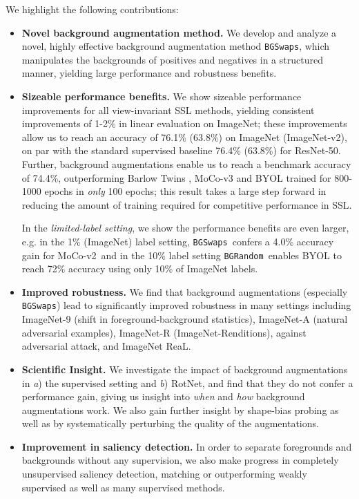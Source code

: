 \documentclass[twoside,11pt]{article}
\newcommand{\bgswaps}{\texttt{BG\textunderscore Swaps}}
\newcommand{\bgrand}{\texttt{BG\textunderscore Random}}
\newcommand{\moco}{MoCo-v2}
\begin{document}
We highlight the following contributions:
\begin{itemize}[leftmargin=2em]
    
    \item \textbf{Novel background augmentation method.} We develop and analyze a novel, highly effective background augmentation method \bgswaps, which manipulates the backgrounds of positives and negatives in a structured manner, yielding large performance and robustness benefits.

    \item \textbf{Sizeable performance benefits.} We show sizeable performance improvements for all view-invariant SSL methods, yielding consistent improvements of 1-2\% in linear evaluation on ImageNet; these improvements allow us to reach an accuracy of 76.1\% (63.8\%) on ImageNet (ImageNet-v2), on par with the standard supervised baseline 76.4\% (63.8\%) for ResNet-50. Further, background augmentations enable us to reach a benchmark accuracy of 74.4\%, outperforming Barlow Twins \citep{zbontar_barlow_2021}, MoCo-v3 \citep{chen_empirical_2021} and BYOL trained for 800-1000 epochs in \textit{only} 100 epochs; this result takes a large step forward in reducing the amount of training required for competitive performance in SSL.
    
    In the \textit{limited-label setting}, we show the performance benefits are even larger, e.g. in the 1\% (ImageNet) label setting, \bgswaps~confers a 4.0\% accuracy gain for \moco~and in the 10\% label setting \bgrand~enables BYOL to reach 72\% accuracy using only 10\% of ImageNet labels.
    
    \item \textbf{Improved robustness.} We find that background augmentations (especially \bgswaps) lead to significantly improved robustness in many settings including ImageNet-9 (shift in foreground-background statistics), ImageNet-A (natural adversarial examples), ImageNet-R (ImageNet-Renditions), against adversarial attack, and ImageNet ReaL.

    \item \textbf{Scientific Insight.} We investigate the impact of background augmentations in \textit{a}) the supervised setting and \textit{b}) RotNet, and find that they do not confer a performance gain, giving us insight into \textit{when} and \textit{how} background augmentations work. We also gain further insight by shape-bias probing as well as by systematically perturbing the quality of the augmentations.
    
    \item \textbf{Improvement in saliency detection.} In order to separate foregrounds and backgrounds without any supervision, we also make progress in completely unsupervised saliency detection, matching or outperforming weakly supervised as well as many supervised methods.
    
\end{itemize}
\end{document}
